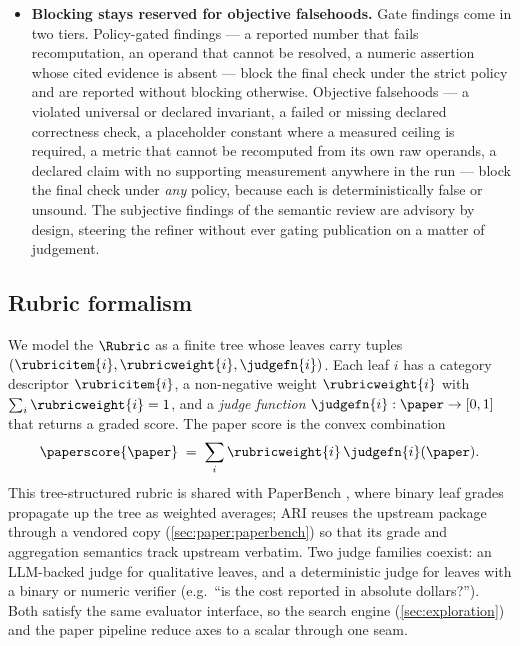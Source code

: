 \begin{itemize}
        clamped away.
  \item \textbf{Blocking stays reserved for objective falsehoods.}
        Gate findings come in two tiers. Policy-gated findings --- a
        reported number that fails recomputation, an operand that
        cannot be resolved, a numeric assertion whose cited evidence
        is absent --- block the final check under the strict policy
        and are reported without blocking otherwise. Objective
        falsehoods --- a violated universal or declared invariant, a
        failed or missing declared correctness check, a placeholder
        constant where a measured ceiling is required, a metric that
        cannot be recomputed from its own raw operands, a declared
        claim with no supporting measurement anywhere in the run ---
        block the final check under \emph{any} policy, because each
        is deterministically false or unsound. The subjective
        findings of the semantic review are advisory by design,
        steering the refiner without ever gating publication on a
        matter of judgement.
\end{itemize}

\subsection{Rubric formalism}\label{sec:paper:rubric}

We model the  $\Rubric$ as a finite tree whose leaves
carry tuples
$(\rubricitem{i},\rubricweight{i},\judgefn{i})$. Each leaf $i$ has
a category descriptor $\rubricitem{i}$, a non-negative weight
$\rubricweight{i}$ with $\sum_i \rubricweight{i}=1$, and a
\emph{judge function} $\judgefn{i}:\paper\to[0,1]$ that returns a
graded score. The paper score is the convex combination
\begin{equation}\label{eq:paperscore}
  \paperscore{\paper} \;=\; \sum_i \rubricweight{i}\,\judgefn{i}(\paper).
\end{equation}
This tree-structured rubric is shared with PaperBench
\cite{starace2025paperbench}, where binary leaf grades propagate up
the tree as weighted averages; ARI reuses the upstream package through
a vendored copy (\cref{sec:paper:paperbench}) so that its grade and
aggregation semantics track upstream verbatim. Two judge families
coexist: an LLM-backed judge for qualitative leaves, and a
deterministic judge for leaves with a binary or numeric verifier
(e.g.\ ``is the cost reported in absolute dollars?''). Both satisfy
the same evaluator interface, so the search engine
(\cref{sec:exploration}) and the paper pipeline reduce axes to a
scalar through one seam.

